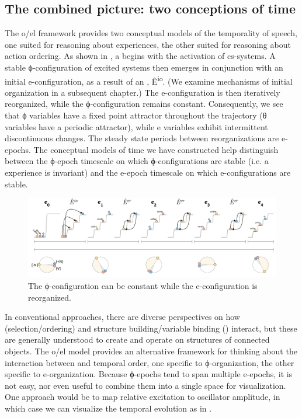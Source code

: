 \subsection{The combined picture: two conceptions of time}

The o/el framework provides two conceptual models of the temporality of speech, one suited for reasoning about  experiences, the other suited for reasoning about action ordering. As shown in {}, a  begins with the activation of cs-systems. A stable ϕ-configuration of excited systems then emerges in conjunction with an initial e-configuration, as a result of an , Ê\textsuperscript{io}. (We examine mechanisms of initial organization in a subsequent chapter.) The e-configuration is then iteratively reorganized, while the ϕ-configuration remains constant. Consequently, we see that ϕ variables have a fixed point attractor throughout the trajectory (θ variables have a periodic attractor), while e variables exhibit intermittent discontinuous changes. The steady state periods between reorganizations are e-epochs. The conceptual models of time we have constructed help distinguish between the ϕ-epoch timescale on which ϕ-configurations are stable (i.e. a  experience is invariant) and the e-epoch timescale on which e-configurations are stable.

  
\begin{figure}
\includegraphics[width=\textwidth]{figures/Tilsen-img27.png}
\caption{The ϕ-configuration can be constant while the e-configuration is reorganized.}
\label{fig:2:20}
\end{figure}
 

  In conventional approaches, there are diverse perspectives on how  (selection/ordering) and structure building/variable binding () interact, but these are generally understood to create and operate on structures of connected objects. The o/el model provides an alternative framework for thinking about the interaction between  and temporal order, one specific to ϕ-organization, the other specific to e-organization. Because ϕ-epochs tend to span multiple e-epochs, it is not easy, nor even useful to combine them into a single space for visualization. One approach would be to map relative excitation to oscillator amplitude, in which case we can visualize the temporal evolution as in {}.

